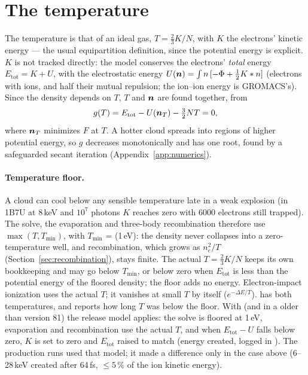 \section{The temperature}
\label{sec:temperature}

The temperature is that of an ideal gas, $T = \frac23K/N$, with $K$ the electrons' kinetic energy --- the usual
equipartition definition, since the potential energy is explicit.
$K$ is not tracked directly: the model conserves the electrons' \emph{total} energy $E_{\mathrm{tot}} = K + U$, with
the electrostatic energy $U(\bm{n}) = \int n\,[-\Phi + \frac12K*n]$ (electrons with ions, and half their mutual
repulsion; the ion--ion energy is GROMACS's).
Since the density depends on $T$, $T$ and $\bm{n}$ are found together, from
\begin{equation}
  g(T) = E_{\mathrm{tot}} - U(\bm{n}_T) - \tfrac32NT = 0,
\end{equation}
where $\bm{n}_T$ minimizes $F$ at $T$.
A hotter cloud spreads into regions of higher potential energy, so $g$ decreases monotonically and has one root,
found by a safeguarded secant iteration (Appendix~\ref{app:numerics}).

\paragraph{Temperature floor.}
A cloud can cool below any sensible temperature late in a weak explosion (in 1B7U at 8\,keV and $10^7$ photons $K$
reaches zero with 6000 electrons still trapped).
The solve, the evaporation and three-body recombination therefore use $\max(T, T_{\min})$, with $T_{\min}$ =
 (1\,eV): the density never collapses into a zero-temperature well, and recombination, which grows as
$n_e^2/T$ (Section~\ref{sec:recombination}), stays finite.
The actual $T = \frac23K/N$ keeps its own bookkeeping and may go below $T_{\min}$, or below zero when
$E_{\mathrm{tot}}$ is less than the potential energy of the floored density; the floor adds no energy.
Electron-impact ionization uses the actual $T$; it vanishes at small $T$ by itself ($e^{-\Delta E/T}$).
 has both temperatures, and  reports how long $T$ was below the floor.
With  (and in a  older than version 81) the release model applies: the solve is floored
at 1\,eV, evaporation and recombination use the actual $T$, and when $E_{\mathrm{tot}} - U$ falls below zero, $K$ is
set to zero and $E_{\mathrm{tot}}$ raised to match (energy created, logged in ).
The production runs used that model; it made a difference only in the case above (6--28\,keV created after 64\,fs,
${\le}5\,\%$ of the ion kinetic energy).

